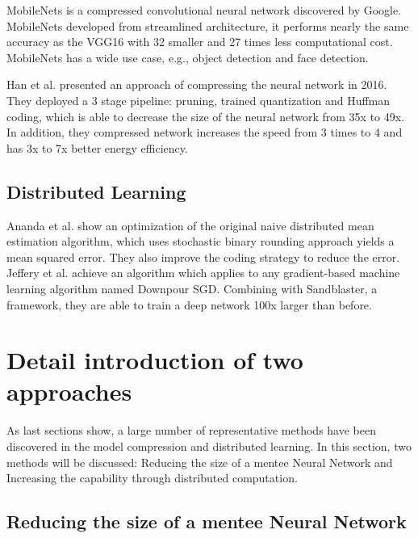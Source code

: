 \documentclass[article]{aaltoseries}
\begin{document}
MobileNets\cite{MobileNets2017} is a compressed convolutional neural network discovered by Google. MobileNets developed 
from streamlined architecture, it performs nearly the same accuracy as the VGG16\cite{simonyan2014very} with 32 smaller
and 27 times less computational cost. MobileNets has a wide use case, e.g., object detection and face detection.

Han et al.\cite{Han2015} presented an approach of compressing the neural network in 2016. 
They deployed a 3 stage pipeline: pruning, trained quantization and Huffman coding, which is able to decrease
the size of the neural network from 35x to 49x. In addition, they compressed network increases the speed from 3 times to 4
and has 3x to 7x better energy efficiency.

\subsection{Distributed Learning}

Ananda et al.\cite{Suresh2016} show an optimization of the original naive distributed mean estimation algorithm, which uses 
stochastic binary rounding approach yields a mean squared error. They also improve the coding strategy to reduce the error.
Jeffery et al.\cite{NIPS2012_4687} achieve an algorithm which applies to any gradient-based 
machine learning algorithm named Downpour SGD.
Combining with Sandblaster, a framework, they are able to train a deep network 100x larger than before.







\section{Detail introduction of two approaches}
\label{sec:approaches}





As last sections show, a large number of representative methods have been discovered in the model compression and distributed learning. 
In this section, two methods will be discussed:
Reducing the size of a mentee Neural Network and Increasing the capability through distributed computation.


\subsection{Reducing the size of a mentee Neural Network}
\end{document}
